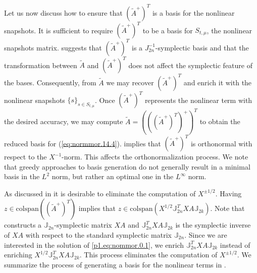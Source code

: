 {Let us now discuss how to ensure that $(\tilde A^+)^T$ is a basis for the nonlinear snapshots.  It is sufficient to require $(\tilde A^+)^T$ to be a basis for $S_{t,\mu}$, the nonlinear snapshots matrix.  suggests that $(\tilde A^+)^T$ is a $J_{2n}^{-1}$-symplectic basis and that the transformation between $\tilde A$ and $(\tilde A^+)^T $ does not affect the symplectic feature of the bases. Consequently, from $\tilde A$ we may recover $(\tilde A^+)^T$ and enrich it with the nonlinear snapshots $\{ s \}_{s\in S_{t,\mu}}$. Once $(\tilde A^+)^T$ represents the nonlinear term with the desired accuracy, we may compute $\tilde A= \left( \left( ( \tilde A^+ )^T \right)^+ \right)^T$ to obtain the reduced basis for (\ref{eq:normmor.14.4}).  implies that $(\tilde A^+)^T$ is orthonormal with respect to the $X^{-1}$-norm. This affects the orthonormalization process. We note that greedy approaches to basis generation do not generally result in a minimal basis in the $L^{2}$ norm, but rather an optimal one in the $L^{\infty}$ norm.

As discussed in  it is desirable to eliminate the computation of $X^{\pm 1/2}$. Having $z \in \text{colspan}\left((\tilde A^+)^T\right)$ implies that $z \in \text{colspan}(X^{1/2} \mathbb J_{2n}^T X A \mathbb J_{2k})$. Note that  constructs a $\mathbb J_{2n}$-symplectic matrix $XA$ and $\mathbb J_{2n}^T X A \mathbb J_{2k}$ is the symplectic inverse of $XA$ with respect to the standard symplectic matrix $\mathbb J_{2n}$. Since we are interested in the solution of \eqref{p1.eq:nommor.0.1}, we enrich $\mathbb J_{2n}^T X A \mathbb J_{2k}$ instead of enriching $X^{1/2} \mathbb J_{2n}^T X A \mathbb J_{2k}$. This process eliminates the computation of $X^{\pm 1/2}$. We summarize the process of generating a basis for the nonlinear terms in .


}
